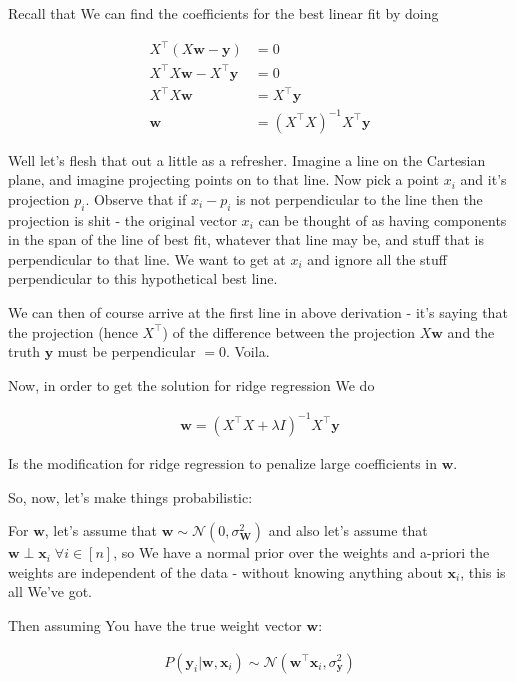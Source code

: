 \documentclass{article}
\begin{document}
		Recall that We can find the coefficients for the best linear fit by doing
		
		\begin{align}
			X^\top (X\mathbf{w} - \mathbf{y}) &= 0\\
			X^\top X\mathbf{w} - X^\top \mathbf{y} &= 0\\
			X^\top X\mathbf{w} &= X^\top \mathbf{y} \\
			\mathbf{w} &= (X^\top X)^{-1}X^\top \mathbf{y}
		\end{align}
		
		Well let's flesh that out a little as a refresher. Imagine a line on the Cartesian plane, and imagine projecting points on to that line. Now pick a point $x_i$ and it's projection $p_i$. Observe that if $x_i-p_i$ is not perpendicular to the line then the projection is shit - the original vector $x_i$ can be thought of as having components in the span of the line of best fit, whatever that line may be, and stuff that is perpendicular to that line. We want to get at $x_i$ and ignore all the stuff perpendicular to this hypothetical best line.
		
		We can then of course arrive at the first line in above derivation - it's saying that the projection (hence $X^\top$) of the difference between the projection $X\mathbf{w}$ and the truth $\mathbf{y}$ must be perpendicular $=0$. Voila.
		
		
		Now, in order to get the solution for ridge regression We do
		
		\begin{align}
			\mathbf{w} = (X^\top X + \lambda I)^{-1}X^\top \mathbf{y}
		\end{align}
				
		Is the modification for ridge regression to penalize large coefficients in $\mathbf{w}$. 
	
		So, now, let's make things probabilistic: 
		
		For $\mathbf{w}$, let's assume that $\mathbf{w}\sim\mathcal{N}(0, \sigma^2_{\mathbf{W}})$ and also let's assume that $\mathbf{w}\perp\mathbf{x}_i \;\forall i\in [n]$, so We have a normal prior over the weights and a-priori the weights are independent of the data - without knowing anything about $\mathbf{x}_i$, this is all We've got.
		
		Then assuming You have the true weight vector $\mathbf{w}$:
		
		\begin{align}
			P(\mathbf{y}_i | \mathbf{w}, \mathbf{x}_i) \sim\mathcal{N}(\mathbf{w}^\top\mathbf{x}_i, \sigma^2_{\mathbf{y}})
		\end{align}
		
\end{document}
